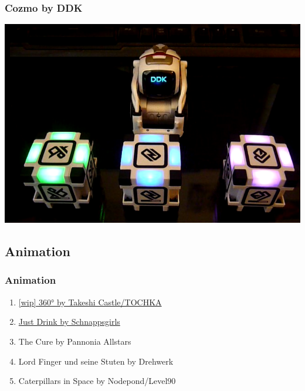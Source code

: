 \documentclass{beamer}
\begin{document}
\begin{frame}
  \frametitle{Cozmo by DDK}
  \includegraphics[width=\textwidth]{cozmo_screen}
\end{frame}

\subsection{Animation}
\begin{frame}
  \frametitle{Animation}
  \begin{enumerate}
  \item \href{https://demozoo.org/productions/191974/}{[wip] 360° by Takeshi Castle/TOCHKA}
  \item \href{https://demozoo.org/productions/191975/}{Just Drink by Schnappsgirls}
  \item The Cure by Pannonia Allstars
  \item Lord Finger und seine Stuten by Drehwerk
  \item Caterpillars in Space by Nodepond/Level90
  \end{enumerate}
\end{frame}
\end{document}
